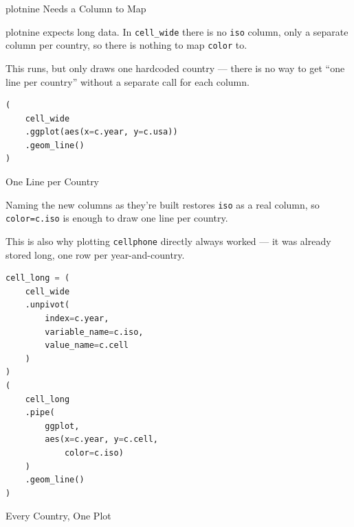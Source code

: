 \documentclass[8pt,aspectratio=169]{beamer}
\begin{document}
\begin{frame}[fragile]{plotnine Needs a Column to Map}
\begin{splitcode}{%

plotnine expects long data. In \texttt{cell\_wide} there is no \texttt{iso} column, only a separate column per country, so there is nothing to map \texttt{color} to.

This runs, but only draws one hardcoded country --- there is no way to get ``one line per country'' without a separate call for each column.

}
\begin{lstlisting}[language=Python]
(
    cell_wide
    .ggplot(aes(x=c.year, y=c.usa))
    .geom_line()
)
\end{lstlisting}
\end{splitcode}
\end{frame}

\begin{frame}[fragile]{One Line per Country}
\begin{splitcode}{%

Naming the new columns as they're built restores \texttt{iso} as a real column, so \texttt{color=c.iso} is enough to draw one line per country.

This is also why plotting \texttt{cellphone} directly always worked --- it was already stored long, one row per year-and-country.

}
\begin{lstlisting}[language=Python]
cell_long = (
    cell_wide
    .unpivot(
        index=c.year,
        variable_name=c.iso,
        value_name=c.cell
    )
)
(
    cell_long
    .pipe(
        ggplot,
        aes(x=c.year, y=c.cell,
            color=c.iso)
    )
    .geom_line()
)
\end{lstlisting}
\end{splitcode}
\end{frame}

\begin{rightframe}{Every Country, One Plot}
\end{rightframe}
\end{document}
